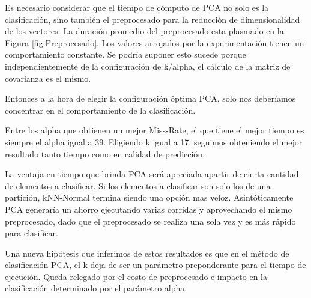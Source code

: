 \documentclass{article}
\begin{document}
Es necesario considerar que el tiempo de cómputo de PCA no solo es la clasificación, sino también el preprocesado para la reducción de dimensionalidad de los vectores. La duración promedio del preprocesado esta plasmado en la Figura  \ref{fig:Preprocesado}. Los valores arrojados por la experimentación tienen un comportamiento constante. Se podría suponer esto sucede porque independientemente de la configuración de k/alpha, el cálculo de la matriz de covarianza es el mismo.

Entonces a la hora de elegir la configuración óptima PCA, solo nos deberíamos concentrar en el comportamiento de la clasificación.

Entre los alpha que obtienen un mejor Miss-Rate, el que tiene el mejor tiempo es siempre el alpha igual a 39. Eligiendo k igual a 17, seguimos obteniendo el mejor resultado tanto tiempo como en calidad de predicción.

 La ventaja en tiempo que brinda PCA será apreciada apartir de cierta cantidad de elementos a clasificar. Si los elementos a clasificar son solo los de una partición, kNN-Normal termina siendo una opción mas veloz. Asintóticamente PCA generaría un ahorro ejecutando varias corridas y aprovechando el mismo preprocesado, dado que el preprocesado se realiza una sola vez y es más rápido para clasificar.

Una nueva hipótesis que inferimos de estos resultados es que en el método de clasificación PCA, el k deja de ser un parámetro preponderante para el tiempo de ejecución. Queda relegado por el costo de preprocesado e impacto en la clasificación determinado por el parámetro alpha.
\end{document}
